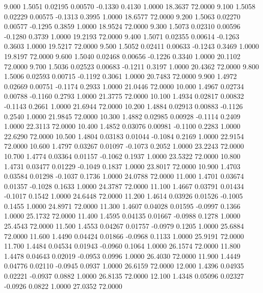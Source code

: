    9.000   1.5051   0.02195   0.00570  -0.1330   0.4130   1.0000  18.3637  72.0000
   9.100   1.5058   0.02229   0.00575  -0.1313   0.3995   1.0000  18.6577  72.0000
   9.200   1.5063   0.02270   0.00577  -0.1295   0.3859   1.0000  18.9524  72.0000
   9.300   1.5073   0.02310   0.00596  -0.1280   0.3739   1.0000  19.2193  72.0000
   9.400   1.5071   0.02355   0.00614  -0.1263   0.3603   1.0000  19.5217  72.0000
   9.500   1.5052   0.02411   0.00633  -0.1243   0.3469   1.0000  19.8197  72.0000
   9.600   1.5040   0.02468   0.00656  -0.1226   0.3340   1.0000  20.1102  72.0000
   9.700   1.5036   0.02523   0.00683  -0.1211   0.3197   1.0000  20.4362  72.0000
   9.800   1.5006   0.02593   0.00715  -0.1192   0.3061   1.0000  20.7483  72.0000
   9.900   1.4972   0.02669   0.00751  -0.1174   0.2933   1.0000  21.0446  72.0000
  10.000   1.4967   0.02734   0.00788  -0.1160   0.2793   1.0000  21.3775  72.0000
  10.100   1.4934   0.02817   0.00832  -0.1143   0.2661   1.0000  21.6944  72.0000
  10.200   1.4884   0.02913   0.00883  -0.1126   0.2540   1.0000  21.9845  72.0000
  10.300   1.4882   0.02985   0.00928  -0.1114   0.2409   1.0000  22.3113  72.0000
  10.400   1.4852   0.03076   0.00981  -0.1100   0.2283   1.0000  22.6290  72.0000
  10.500   1.4804   0.03183   0.01044  -0.1084   0.2169   1.0000  22.9154  72.0000
  10.600   1.4797   0.03267   0.01097  -0.1073   0.2052   1.0000  23.2243  72.0000
  10.700   1.4774   0.03364   0.01157  -0.1062   0.1937   1.0000  23.5322  72.0000
  10.800   1.4731   0.03477   0.01229  -0.1049   0.1837   1.0000  23.8017  72.0000
  10.900   1.4703   0.03584   0.01298  -0.1037   0.1736   1.0000  24.0788  72.0000
  11.000   1.4701   0.03674   0.01357  -0.1028   0.1633   1.0000  24.3787  72.0000
  11.100   1.4667   0.03791   0.01434  -0.1017   0.1542   1.0000  24.6448  72.0000
  11.200   1.4614   0.03926   0.01526  -0.1005   0.1455   1.0000  24.8971  72.0000
  11.300   1.4607   0.04028   0.01595  -0.0997   0.1366   1.0000  25.1732  72.0000
  11.400   1.4595   0.04135   0.01667  -0.0988   0.1278   1.0000  25.4543  72.0000
  11.500   1.4553   0.04267   0.01757  -0.0979   0.1205   1.0000  25.6884  72.0000
  11.600   1.4490   0.04424   0.01866  -0.0968   0.1133   1.0000  25.9191  72.0000
  11.700   1.4484   0.04534   0.01943  -0.0960   0.1064   1.0000  26.1574  72.0000
  11.800   1.4478   0.04643   0.02019  -0.0953   0.0996   1.0000  26.4030  72.0000
  11.900   1.4449   0.04776   0.02110  -0.0945   0.0937   1.0000  26.6159  72.0000
  12.000   1.4396   0.04935   0.02221  -0.0937   0.0882   1.0000  26.8135  72.0000
  12.100   1.4348   0.05096   0.02327  -0.0926   0.0822   1.0000  27.0352  72.0000
